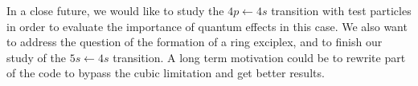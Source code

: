 In a close future, we would like to study the $4p \leftarrow 4s$ transition with test particles in order to evaluate the importance of quantum effects in this case.
We also want to address the question of the formation of a ring exciplex, and to finish our study of the $5s \leftarrow 4s$ transition. 
A long term motivation could be to rewrite part of the code to bypass the cubic limitation and get better results.

